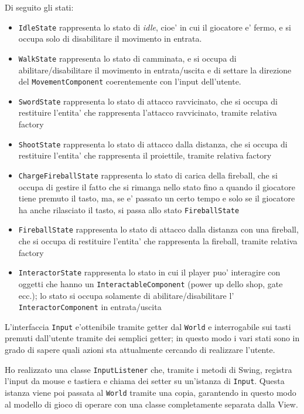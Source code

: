 \documentclass[a4paper,12pt]{report}
\begin{document}
Di seguito gli stati:
\begin{itemize}
	\item \texttt{IdleState} rappresenta lo stato di \textit{idle}, cioe' in cui il giocatore e' fermo, e si occupa solo di disabilitare il movimento in entrata.
	\item \texttt{WalkState} rappresenta lo stato di camminata, e si occupa di abilitare/disabilitare il movimento in entrata/uscita e di settare la direzione del \texttt{MovementComponent} coerentemente con l'input dell'utente.
	\item \texttt{SwordState} rappresenta lo stato di attacco ravvicinato, che si occupa di restituire l'entita' che rappresenta l'attacco ravvicinato, tramite relativa factory
	\item \texttt{ShootState} rappresenta lo stato di attacco dalla distanza, che si occupa di restituire l'entita' che rappresenta il proiettile, tramite relativa factory
	\item \texttt{ChargeFireballState} rappresenta lo stato di carica della fireball, che si occupa di gestire il fatto che si rimanga nello stato fino a quando il giocatore tiene premuto il tasto, ma, se e' passato un certo tempo e solo se il giocatore ha anche rilasciato il tasto, si passa allo stato \texttt{FireballState}
	\item \texttt{FireballState} rappresenta lo stato di attacco dalla distanza con una fireball, che si occupa di restituire l'entita' che rappresenta la fireball, tramite relativa factory
	\item \texttt{InteractorState} rappresenta lo stato in cui il player puo' interagire con oggetti che hanno un \texttt{InteractableComponent} (power up dello shop, gate ecc.); lo stato si occupa solamente di abilitare/disabilitare l' \texttt{InteractorComponent} in entrata/uscita
\end{itemize}

L'interfaccia \texttt{Input} e'ottenibile tramite getter dal \texttt{World} e interrogabile sui tasti premuti dall'utente tramite dei semplici getter; in questo modo i vari stati sono in grado di sapere quali azioni sta attualmente cercando di realizzare l'utente.

Ho realizzato una classe \texttt{InputListener} che, tramite i metodi di Swing, registra l'input da mouse e tastiera e chiama dei setter su un'istanza di \texttt{Input}. Questa istanza viene poi passata al \texttt{World} tramite una copia, garantendo in questo modo al modello di gioco di operare con una classe completamente separata dalla View.
\end{document}
